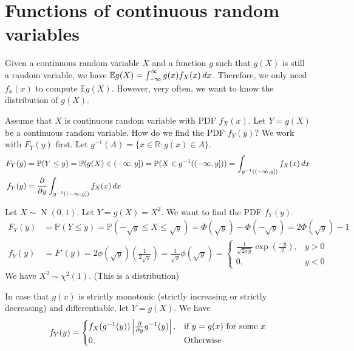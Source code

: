 \documentclass{huhtakm-template-book}
\newcommand{\prob}{\mathbb{P}}
\newcommand{\expect}{\mathbb{E}}
\DeclareMathOperator{\N}{N}
\begin{document}
\section{Functions of continuous random variables}
    Given a continuous random variable $X$ and a function $g$ such that $g(X)$ is still a random variable, we have $\expect g(X)=\intinfty g(x)f_{X}(x)\,dx$. Therefore, we only need $f_{x}(x)$ to compute $\expect g(X)$. However, very often, we want to know the distribution of $g(X)$.
    \begin{eg}
        Assume that $X$ is continuous random variable with PDF $f_{X}(x)$. Let $Y=g(X)$ be a continuous random variable. How do we find the PDF $f_{Y}(y)$? We work with $F_{Y}(y)$ first. Let $g^{-1}(A)=\{x\in\mathbb{R}:g(x)\in A\}$.
        \begin{align*}
            F_{Y}(y)&=\prob(Y\leq y)=\prob(g(X)\in(-\infty,y])=\prob(X\in g^{-1}((-\infty,y]))=\int_{g^{-1}((-\infty,y])}f_{X}(x)\,dx\\
            f_{Y}(y)&=\pdv*{\int_{g^{-1}((-\infty,y])}f_{X}(x)\,dx}{y}
        \end{align*}
    \end{eg}
    \begin{eg}
        Let $X\sim\N(0,1)$. Let $Y=g(X)=X^{2}$. We want to find the PDF $f_{Y}(y)$.
        \begin{align*}
            F_{Y}(y)&=\prob(Y\leq y)=\prob(-\sqrt{y}\leq X\leq \sqrt{y})=\Phi(\sqrt{y})-\Phi(-\sqrt{y})=2\Phi(\sqrt{y})-1\\
            f_{Y}(y)&=F'(y)=2\phi(\sqrt{y})\left(\frac{1}{2\sqrt{y}}\right)=\frac{1}{\sqrt{y}}\phi(\sqrt{y})=\begin{cases}
                \frac{1}{\sqrt{2\pi y}}\exp\left(\frac{-y}{2}\right), &y>0\\
                0, &y<0
            \end{cases}
        \end{align*}
        We have $X^{2}\sim\chi^{2}(1)$. (This is a distribution)
    \end{eg}
    \begin{thm}
        In case that $g(x)$ is strictly monotonic (strictly increasing or strictly decreasing) and differentiable, let $Y=g(X)$. We have
        \begin{equation*}
            f_{Y}(y)=\begin{cases}
                f_{X}(g^{-1}(y))\left|{\pdv*{g^{-1}(y)}{y}}\right|, &\text{if }y=g(x)\text{ for some }x\\
                0, &\text{Otherwise}
            \end{cases}
        \end{equation*}
    \end{thm}
\end{document}
